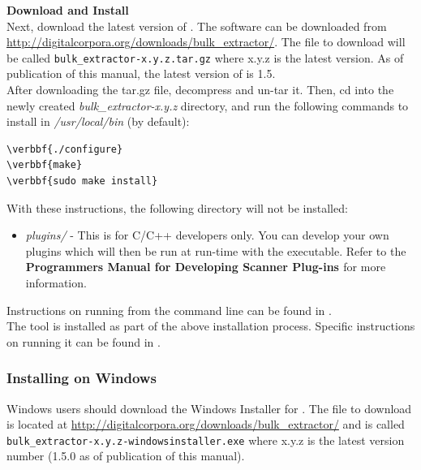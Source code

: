 \documentclass[11pt]{article} %
\begin{document}
\textbf{Download and Install \bulk}\\
Next, download the latest version of \bulk. The software can be downloaded from \url{http://digitalcorpora.org/downloads/bulk_extractor/}. The file to download will be called \texttt{bulk\_extractor-x.y.z.tar.gz} where x.y.z is the latest version. As of publication of this manual, the latest version of \bulk is 1.5. \\

After downloading the tar.gz file, decompress and un-tar it. Then, cd into the newly created \textit{bulk\_extractor-x.y.z} directory, and run the following commands to install \bulk in \textit{/usr/local/bin} (by default):

\begin{Verbatim}[commandchars=\\\{\}]
\verbbf{./configure}
\verbbf{make}
\verbbf{sudo make install}
\end{Verbatim}

With these instructions, the following directory will not be installed:
\begin{itemize}
\item{\textit{plugins/} - This is for C/C++ developers only. You can develop your own \bulk plugins which will then be run at run-time with the \bulk executable. Refer to the \textbf{\bulk Programmers Manual for Developing Scanner Plug-ins \cite{programmersmanual}} for more information.}
\end{itemize}
Instructions on running \bulk from the command line can be found in \textbf{}.\\
	
The \viewer tool is installed as part of the above installation process. Specific instructions on running it can be found in \textbf{}.

\subsubsection{Installing on Windows}
\label{InstallOnWindows}
Windows users should download the Windows Installer for \bulk.  The file to download is located at \url{http://digitalcorpora.org/downloads/bulk_extractor/} and is called \texttt{bulk\_extractor-x.y.z-windowsinstaller.exe} where x.y.z is the latest version number (1.5.0 as of publication of this manual).   \\
\end{document}
